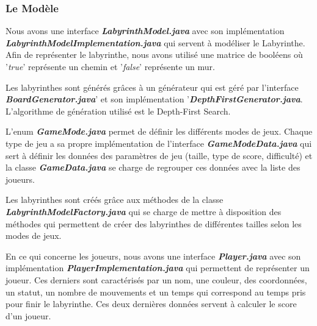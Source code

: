 \subsubsection{Le Modèle}
\label{subsubsec:modele}

Nous avons une interface \textbf{\textit{LabyrinthModel.java}} avec son implémentation
\textbf{\textit{LabyrinthModelImplementation.java}} qui servent à modéliser le Labyrinthe.
Afin de représenter le labyrinthe, nous avons utilisé une matrice de booléens
où '\textit{true}' représente un chemin et '\textit{false}' représente un mur.

Les labyrinthes sont générés grâces à un générateur qui est géré par
l'interface \textbf{\textit{BoardGenerator.java}}' et son implémentation '\textbf{\textit{DepthFirstGenerator.java}}.
L'algorithme de génération utilisé est le Depth-First Search.

L'enum \textbf{\textit{GameMode.java}} permet de définir les différents modes de jeux.
Chaque type de jeu a sa propre implémentation de l'interface \textbf{\textit{GameModeData.java}}
qui sert à définir les données des paramètres de jeu
(taille, type de score, difficulté) et la classe \textbf{\textit{GameData.java}} se charge de
regrouper ces données avec la liste des joueurs.

Les labyrinthes sont créés grâce aux méthodes de la classe
\textbf{\textit{LabyrinthModelFactory.java}} qui se charge de mettre à disposition des méthodes
qui permettent de créer des labyrinthes de différentes tailles selon les modes
de jeux.

En ce qui concerne les joueurs, nous avons une interface \textbf{\textit{Player.java}} avec son
implémentation \textbf{\textit{PlayerImplementation.java}} qui permettent de représenter un
joueur. Ces derniers sont caractérisés par un nom, une couleur, des coordonnées, un
statut, un nombre de mouvements et un temps qui correspond au temps pris pour finir le labyrinthe.
Ces deux dernières données servent à calculer le score d'un joueur.

